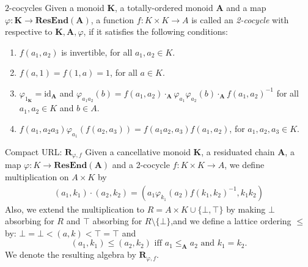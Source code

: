 \documentclass[professionalfont, 12pt]{beamer} %
\theoremstyle{plain}
\theoremstyle{definition}
\newcommand{\m}[1]{{\mathbf {#1} }}
\begin{document}
\begin{frame}{$2$-cocycles}
    Given a monoid $\mathbf{K}$, a totally-ordered monoid $\mathbf{A}$ and a map $\varphi: \mathbf{K} \rightarrow \m {ResEnd}(\mathbf{A})$, a function $f: K \times K \rightarrow A$ is called an \emph{2-cocycle} with respective to $\m K, \m A, \varphi$, if it satisfies the following conditions:
    \begin{enumerate}
    \item $f(a_1, a_2)$ is invertible, for all $a_1, a_2 \in K$.

    \item $f(a, 1) = f(1,a)= 1$, for all $a \in K$.

    \item $\varphi_{1_{\mathbf{K}}} = \text{id}_{\mathbf{A}}$ and $\varphi_{a_1 a_2} (b) = f(a_1, a_2) \cdot_{\mathbf{A}} \varphi_{a_1} \varphi_{a_2} (b) \cdot_{\mathbf{A}} f(a_1, a_2)^{-1}$ for all $a_1, a_2 \in K$ and $b \in A$.
    
    \item $f(a_1, a_2 a_3) \varphi_{a_1}(f(a_2, a_3)) = f(a_1 a_2, a_3) f(a_1, a_2)$, for $a_1, a_2, a_3 \in K$.
    \end{enumerate}
\end{frame}

\begin{frame}{Compact URL: $\m R_{\varphi, f}$}
    Given a cancellative monoid $\mathbf{K}$, a residuated chain $\mathbf{A}$, a map $\varphi: K \rightarrow \m {ResEnd}(\mathbf{A})$ and a 2-cocycle $f: K \times K \rightarrow A$, we  define multiplication on $A \times K$ by 
    \begin{align*}
    (a_1, k_1) \cdot (a_2, k_2) = (a_1 \varphi_{k_1} (a_2) f(k_1, k_2)^{-1}, k_1 k_2)
    \end{align*}
    Also, we extend the multiplication to $R = A \times K \cup \{\bot, \top\}$ by making $\bot$ absorbing for $R$ and $\top$ absorbing for $R \setminus\{\bot\}$,and we define a lattice ordering $\leq$ by: $\bot = \bot < (a, k) < \top = \top$ and
    \[
    (a_1, k_1) \leq (a_2, k_2) \text{ iff } a_1 \leq_{\mathbf{A}} a_2 \text{ and } k_1 = k_2.
    \]
    We denote the resulting algebra by $\mathbf{R}_{\varphi, f}$.
\end{frame}
\end{document}
